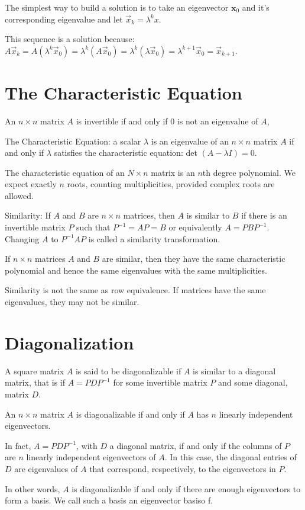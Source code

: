 \documentclass[../linalg.tex]{subfiles}
\begin{document}
The simplest way to build a solution is to take an eigenvector $\textbf{x}_0$ and it's corresponding eigenvalue and let $\vec{x}_k=\lambda^k x$.

This sequence is a solution because: $A\vec{x}_k=A(\lambda^k\vec{x}_0)=\lambda^k(A\vec{x}_0)=\lambda^k(\lambda \vec{x}_0)=\lambda^{k+1}\vec{x}_0=\vec{x}_{k+1}$.


\section{The Characteristic Equation}
\begin{theorem}
    An $n\times n$ matrix $A$ is invertible if and only if 0 is not an eigenvalue of $A$,
\end{theorem}

The Characteristic Equation: a scalar $\lambda$ is an eigenvalue of an $n\times n$ matrix $A$ if and only if $\lambda$ satisfies the characteristic equation: det $(A-\lambda I)=0$.

The characteristic equation of an $N\times n$ matrix is an $n$th degree polynomial. We expect exactly $n$ roots, counting multiplicities, provided complex roots are allowed.

Similarity: If $A$ and $B$ are $n\times n$ matrices, then $A$ is similar to $B$ if there is an invertible matrix $P$ such that $P^{-1}=AP=B$ or equivalently $A=PBP^{-1}$. Changing $A$ to $P^{-1}AP$ is called a similarity transformation.

\begin{theorem}
    If $n\times n$ matrices $A$ and $B$ are similar, then they have the same characteristic polynomial and hence the same eigenvalues with the same multiplicities. 

    Similarity is not the same as row equivalence. If matrices have the same eigenvalues, they may not be similar.
\end{theorem}

\section{Diagonalization}
A square matrix $A$ is said to be diagonalizable if $A$ is similar to a diagonal matrix, that is if 
$A=PDP^{-1}$ for some invertible matrix $P$ and some diagonal, matrix $D$.

\begin{theorem}
    An $n\times n$ matrix $A$ is diagonalizable if and only if $A$ has $n$ linearly independent eigenvectors.

    In fact, $A=PDP^{-1}$, with $D$ a diagonal matrix, if and only if the columns of $P$ are $n$ linearly independent eigenvectors of $A$.
    In this case, the diagonal entries of $D$ are eigenvalues of $A$ that correspond, respectively, to the eigenvectors in $P$.

    In other words, $A$ is diagonalizable if and only if there are enough eigenvectors to form a basis. We call such a basis an eigenvector basiso f.
\end{theorem}
\end{document}
